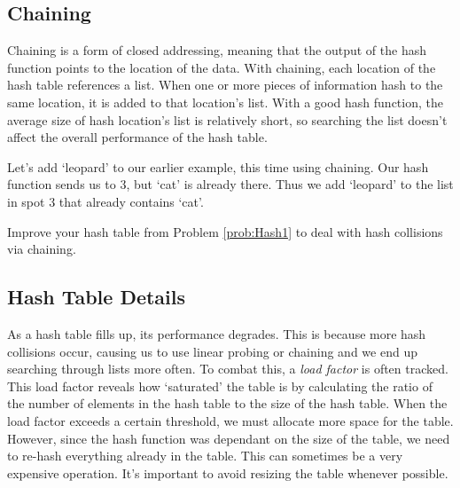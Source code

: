 \subsection*{Chaining}
Chaining is a form of closed addressing, meaning that the output of the hash function points to the location of the data.
With chaining, each location of the hash table references a list.
When one or more pieces of information hash to the same location, it is added to that location's list.
With a good hash function, the average size of hash location's list is relatively short, so searching the list doesn't affect the overall performance of the hash table.

Let's add `leopard' to our earlier example, this time using chaining.
Our hash function sends us to 3, but `cat' is already there.
Thus we add `leopard' to the list in spot 3 that already contains `cat'.
\begin{center}
\end{center}

\begin{problem}
Improve your hash table from Problem \ref{prob:Hash1} to deal with hash collisions via chaining.
\end{problem}

\subsection*{Hash Table Details}
As a hash table fills up, its performance degrades.
This is because more hash collisions occur, causing us to use linear probing or chaining and we end up searching through lists more often.
To combat this, a \emph{load factor} is often tracked.
This load factor reveals how `saturated' the table is by calculating the ratio of the number of elements in the hash table to the size of the hash table.
When the load factor exceeds a certain threshold, we must allocate more space for the table.
However, since the hash function was dependant on the size of the table, we need to re-hash everything already in the table.
This can sometimes be a very expensive operation.
It's important to avoid resizing the table whenever possible.

